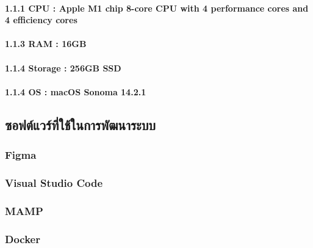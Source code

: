 \hspace{2.5cm}\hangindent=4.9cm\paragraph{1.1.1 CPU : Apple M1 chip 8-core CPU with 4 perform­ance cores and 4 efficiency cores}

\hspace{2.5cm}\hangindent=4.9cm\paragraph{1.1.3 RAM : 16GB}

\hspace{2.5cm}\hangindent=4.9cm\paragraph{1.1.4 Storage : 256GB SSD}

\hspace{2.5cm}\hangindent=4.9cm\paragraph{1.1.4 OS : macOS Sonoma 14.2.1 }


\hspace{0cm}\subsection{ซอฟต์แวร์ที่ใช้ในการพัฒนาระบบ}

\hspace{1cm}\subsubsection{Figma}

\hspace{1cm}\subsubsection{Visual Studio Code}

\hspace{1cm}\subsubsection{MAMP}

\hspace{1cm}\subsubsection{Docker}

